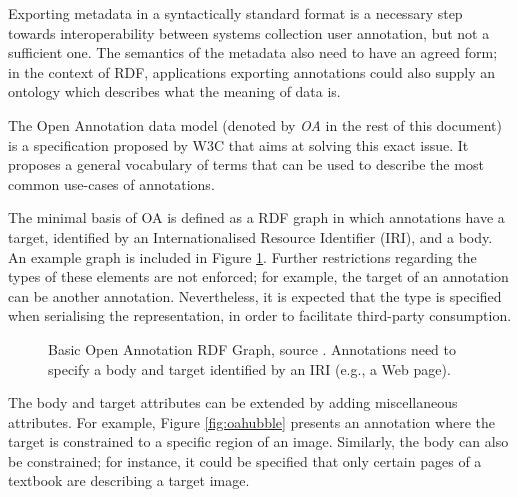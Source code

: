 
Exporting metadata in a syntactically standard format is a necessary step
towards interoperability between systems collection user annotation, but not a
sufficient one. The semantics of the metadata also need to have an agreed form;
in the context of RDF, applications exporting annotations could also supply an
ontology which describes what the meaning of data is.

The Open Annotation \cite{ref:oa} data model (denoted by \textit{OA} in the
rest of this document) is a specification proposed by W3C that aims at solving
this exact issue. It proposes a general vocabulary of terms that can be used to
describe the most common use-cases of annotations.

The minimal basis of OA is defined as a RDF graph in which annotations have a
target, identified by an Internationalised Resource Identifier (IRI), and a
body. An example graph is included in Figure \ref{fig:oa}. Further restrictions
regarding the types of these elements are not enforced; for example, the target
of an annotation can be another annotation. Nevertheless, it is expected that
the type is specified when serialising the representation, in order to
facilitate third-party consumption.

\begin{figure}[!ht]
  \centering
  \caption[Basic Open Annotation RDF Graph]
          {Basic Open Annotation RDF Graph, source \cite{ref:oa}. Annotations
           need to specify a body and target identified by an IRI (e.g., a
           Web page).}
  \label{fig:oa}
\end{figure}

The body and target attributes can be extended by adding miscellaneous attributes.
For example, Figure \ref{fig:oahubble} presents an annotation where the target
is constrained to a specific region of an image. Similarly, the body can also
be constrained; for instance, it could be specified that only certain pages of
a textbook are describing a target image.

